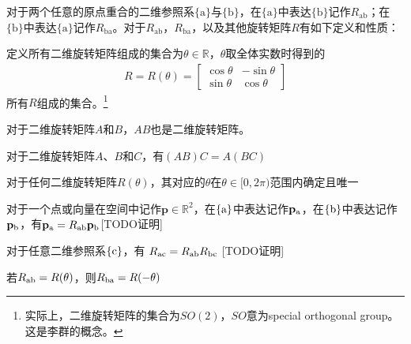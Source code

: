 \documentclass[12pt, a4paper, article, UTF8]{ctexart}
\begin{document}
对于两个任意的原点重合的二维参照系$\{\text{a}\}$与$\{\text{b}\}$，在$\{\text{a}\}$中表达$\{\text{b}\}$记作$R_\text{ab}$；在$\{\text{b}\}$中表达$\{\text{a}\}$记作$R_\text{ba}$。对于$R_\text{ab}$，$R_\text{ba}$，以及其他旋转矩阵$R$有如下定义和性质：
\begin{mydefinition}
定义所有二维旋转矩阵组成的集合为$\theta \in \mathbb{R}$，$\theta $取全体实数时得到的\begin{align}
R = R(\theta) = \begin{bmatrix}
\cos{\theta} & -\sin{\theta}\\
\sin{\theta} & \cos{\theta}
\end{bmatrix} \label{eq:2ddefinition}
\end{align}
所有$R$组成的集合。\footnote{实际上，二维旋转矩阵的集合为$SO(2)$，$SO$意为special orthogonal group。这是李群的概念。} \label{def:2drotation}
\end{mydefinition}

\begin{mytheorem}
对于二维旋转矩阵$A$和$B$，$AB$也是二维旋转矩阵。\label{th:2dproductclosure}
\end{mytheorem}

\begin{mytheorem}
对于二维旋转矩阵$A$、$B$和$C$，有$(AB)C=A(BC)$ \label{th:2dassociative}
\end{mytheorem}

\begin{mytheorem}
对于任何二维旋转矩阵$R(\theta)$，其对应的$\theta$在$\theta\in [0,2\pi)$范围内确定且唯一  \label{th:2dthetaonly}
\end{mytheorem}

\begin{mytheorem}
对于一个点或向量在空间中记作$\mathbf{p}\in\mathbb{R}^2$，在$\{\textnormal{a}\}$中表达记作$\mathbf{p}_\textnormal{a}$，在$\{\textnormal{b}\}$中表达记作$\mathbf{p}_\textnormal{b}$，有$\mathbf{p}_\textnormal{a}=R_\textnormal{ab}\mathbf{p}_\textnormal{b}$[TODO证明]
\label{th:2dchangeframe}
\end{mytheorem}

\begin{mytheorem}
对于任意二维参照系$\{\textnormal{c}\}$，有
$R_\textnormal{ac} = R_\textnormal{ab}R_\textnormal{bc}$ [TODO证明]
\end{mytheorem}

\begin{mytheorem}
若$R_\textnormal{ab}=R(\theta)$，则$R_\textnormal{ba}=R(-\theta)$ \label{th:2dminustheta}
\end{mytheorem}
\end{document}
